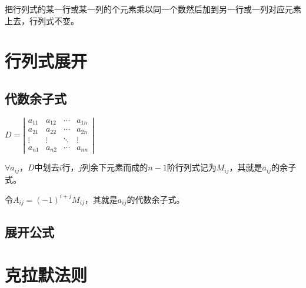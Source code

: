 \documentclass[UTF8, 12pt]{ctexart}
\begin{document}
把行列式的某一行或某一列的个元素乘以同一个数然后加到另一行或一列对应元素上去，行列式不变。

\section{行列式展开}

\subsection{代数余子式}

$
D=\left|\begin{array}{cccc} 
    a_{11} & a_{12} & \cdots & a_{1n} \\
    a_{21} & a_{22} & \cdots & a_{2n} \\
    \vdots & \vdots & \ddots & \vdots \\
    a_{n1} & a_{n2} & \cdots & a_{nn}
\end{array}\right|
$

$\forall a_{ij}$，$D$中划去$i$行，$j$列余下元素而成的$n-1$阶行列式记为$M_{ij}$，其就是$a_{ij}$的余子式。

令$A_{ij}=(-1)^{i+j}M_{ij}$，其就是$a_{ij}$的代数余子式。

\subsection{展开公式}

\section{克拉默法则}
\end{document}
